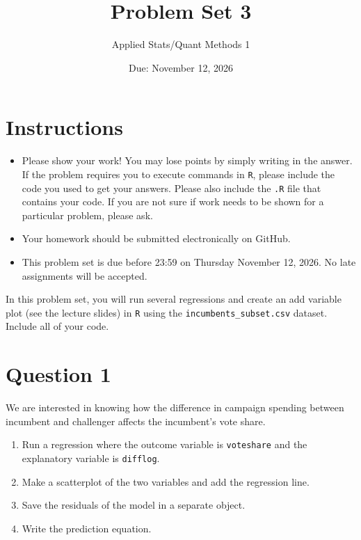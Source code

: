 \documentclass[12pt,letterpaper]{article}
\title{Problem Set 3}
\date{Due: November 12, 2026}
\author{Applied Stats/Quant Methods 1}
\begin{document}
	\maketitle
	\section*{Instructions}
	\begin{itemize}
		\item Please show your work! You may lose points by simply writing in the answer. If the problem requires you to execute commands in \texttt{R}, please include the code you used to get your answers. Please also include the \texttt{.R} file that contains your code. If you are not sure if work needs to be shown for a particular problem, please ask.
	\item Your homework should be submitted electronically on GitHub.
	\item This problem set is due before 23:59 on Thursday November 12, 2026. No late assignments will be accepted.

	\end{itemize}

		\vspace{.25cm}
	
\noindent In this problem set, you will run several regressions and create an add variable plot (see the lecture slides) in \texttt{R} using the \texttt{incumbents\_subset.csv} dataset. Include all of your code.

	\vspace{.5cm}
\section*{Question 1}
\vspace{.25cm}
\noindent We are interested in knowing how the difference in campaign spending between incumbent and challenger affects the incumbent's vote share. 
	\begin{enumerate}
		\item Run a regression where the outcome variable is \texttt{voteshare} and the explanatory variable is \texttt{difflog}.	\vspace{5cm}
		\item Make a scatterplot of the two variables and add the regression line. 	\vspace{7cm}
		\item Save the residuals of the model in a separate object.	\vspace{7cm}
		\item Write the prediction equation.
	\end{enumerate}
	
\end{document}
